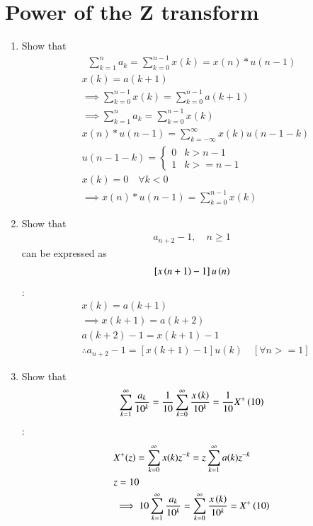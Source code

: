 \documentclass[journal,12pt,twocolumn]{IEEEtran}
\renewcommand\thesection{\arabic{section}}
\begin{document}
\section{Power of the Z transform}
\begin{enumerate}[label=\thesection.\arabic*,ref=\thesection.\theenumi]
\item Show that 
\begin{align}
	\sum_{k=1}^{n}a_k = 
	\sum_{k=0}^{n-1}x(k) = x(n)*u(n-1)
\end{align}
\solution
\begin{align}
	& x(k)=a(k+1)\\
	&\implies \sum_{k=0}^{n-1} x(k)=\sum_{k=0}^{n-1} a(k+1)\\
	&\implies \sum_{k=1}^{n}a_{k} = \sum_{k=0}^{n-1}x(k)\\
	& x(n)*u(n-1)=\sum_{k=-\infty}^{\infty} x(k) u(n-1-k)\\
	&u(n-1-k)=\begin{cases}
		0 & k>n-1\\
		1 & k>=n-1
	\end{cases}\\
	&x(k)=0 \quad \forall k<0\\
	&\implies x(n)*u(n-1)=\sum_{k=0}^{n-1} x(k)
\end{align}
\item Show that 
\begin{align}
	a_{n+2}-1, \quad n \ge 1
\end{align}
can be expressed as 
\begin{align}
	{}\left[x\left(n+1\right)-1\right]u\left(n\right)
\end{align}
\solution:
\begin{align}
	&x(k)=a(k+1)\\
	&\implies x(k+1)=a(k+2)\\
	&a(k+2)-1=x(k+1)-1\\
	&\therefore a_{n+2}-1=[x(k+1)-1]u(k) \quad [\forall n>=1]
\end{align}
\item Show that 
\begin{align}
	\sum_{k=1}^{\infty}\frac{a_k}{10^k}= 
	\frac{1}{10}\sum_{k=0}^{\infty}\frac{x\left(k\right)}{10^k} =\frac{1}{10}X^{+}\left({10}\right)
\end{align}
\solution:
\begin{align}
	&X^{+}(z)=\sum_{k=0}^{\infty} x(k)z^{-k}=z\sum_{k=1}^{\infty} a(k) z^{-k}\\
	&z=10\\
	&\implies 10\sum_{k=1}^{\infty}\frac{a_k}{10^k}=\sum_{k=0}^{\infty}\frac{x\brak{k}}{10^k} =X^{+}\brak{{10}}\\

\end{align}
\end{enumerate}
\end{document}
